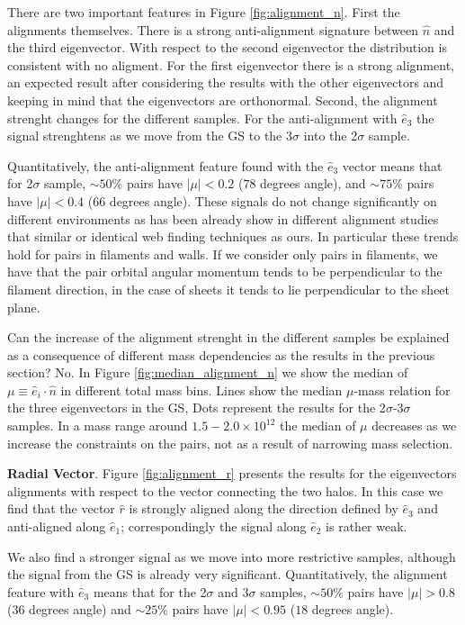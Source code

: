 \documentclass{emulateapj}
\newcommand{\msun}{{\ifmmode{{\rm {M_{\odot}}}}\else{${\rm{M_{\odot}}}$}\fi}}
\begin{document}
There are two important features in Figure \ref{fig:alignment_n}.
First the alignments themselves. 
There is a strong anti-alignment signature between $\hat{n}$ and the
third eigenvector. 
With respect to the second eigenvector the distribution is consistent
with no aligment. 
For the first eigenvector there is a strong alignment, an expected
result after considering the results with the other eigenvectors and
keeping in mind that the eigenvectors are orthonormal.
Second, the alignment strenght changes for the different samples. 
For the anti-alignment with $\hat{e}_3$ the signal strenghtens as we
move from the GS to the 3$\sigma$ into the 2$\sigma$ sample.

Quantitatively, the anti-alignment feature found with the $\hat{e}_3$ 
vector means that for 2$\sigma$ sample, $\sim 50\%$ pairs have
$|\mu|<0.2$ ($78$ degrees angle), and $\sim 75\%$ pairs have $|\mu|<0.4$
($66$ degrees angle). 
These signals do not change significantly on
different environments as has been already show in different alignment
studies that similar \citep{Libeskind2013} or identical
\citep{ForeroRomero2014} web finding techniques as ours.
In particular  these trends hold for pairs in filaments and walls.
If we consider only pairs in filaments, we have that the pair orbital
angular momentum tends to be perpendicular to the filament direction,
in the case of sheets it tends to lie perpendicular to the sheet plane.

Can the increase of the alignment strenght in the different samples be
explained as a consequence of different mass dependencies as the
results in the previous section? No. 
In Figure \ref{fig:median_alignment_n} we show the median of
$\mu\equiv\hat{e}_i\cdot\hat{n}$ in different total mass bins.
Lines show the median $\mu$-mass relation for the three 
eigenvectors in the GS, Dots represent the results for the
2$\sigma$-3$\sigma$ samples. 
In a mass range around $1.5-2.0 \times 10^{12}$ \msun the median of
$\mu$ decreases as we increase the constraints on the pairs, not as a
result of narrowing mass selection. 


{\bf Radial Vector}.  Figure \ref{fig:alignment_r} presents the
results for the eigenvectors alignments with respect to the vector
connecting the two halos. 
In this case we find that the vector $\hat{r}$
is strongly aligned along the direction defined by
$\hat{e}_3$ and anti-aligned along $\hat{e}_1$; correspondingly the
signal along $\hat{e}_2$ is rather weak. 

We also find a stronger signal as we move into more restrictive
samples, although the signal from the GS is already very
significant. 
Quantitatively, the alignment feature with $\hat{e}_3$
means that for the 2$\sigma$ and 3$\sigma$ samples, $\sim 50\%$ pairs
have $|\mu|>0.8$ ($36$ degrees angle) and $\sim 25\%$ pairs have
$|\mu|<0.95$ ($18$ degrees angle).
\end{document}
